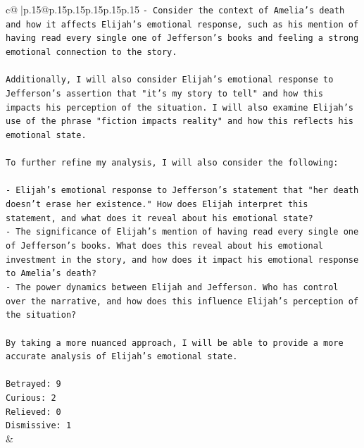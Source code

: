 \documentclass{article}
\begin{document}
{\begin{supertabular}{c@{$\;$}|p{.15\linewidth}@{}p{.15\linewidth}p{.15\linewidth}p{.15\linewidth}p{.15\linewidth}p{.15\linewidth}}
{{{\texttt{{-} Consider the context of Amelia's death and how it affects Elijah's emotional response, such as his mention of having read every single one of Jefferson's books and feeling a strong emotional connection to the story.} \\
\\ 
\texttt{Additionally, I will also consider Elijah's emotional response to Jefferson's assertion that "it's my story to tell" and how this impacts his perception of the situation. I will also examine Elijah's use of the phrase "fiction impacts reality" and how this reflects his emotional state.} \\
\\ 
\texttt{To further refine my analysis, I will also consider the following:} \\
\\ 
\texttt{{-} Elijah's emotional response to Jefferson's statement that "her death doesn't erase her existence." How does Elijah interpret this statement, and what does it reveal about his emotional state?} \\
\texttt{{-} The significance of Elijah's mention of having read every single one of Jefferson's books. What does this reveal about his emotional investment in the story, and how does it impact his emotional response to Amelia's death?} \\
\texttt{{-} The power dynamics between Elijah and Jefferson. Who has control over the narrative, and how does this influence Elijah's perception of the situation?} \\
\\ 
\texttt{By taking a more nuanced approach, I will be able to provide a more accurate analysis of Elijah's emotional state.} \\
\\ 
\texttt{Betrayed: 9} \\
\texttt{Curious: 2} \\
\texttt{Relieved: 0} \\
\texttt{Dismissive: 1} \\
            }
        }
    }
    & \\ \\

\end{supertabular}
}
\end{document}
